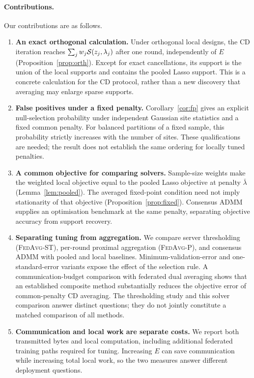\paragraph{Contributions.} Our contributions are as follows.

\begin{enumerate}
\item \textbf{An exact orthogonal calculation.} Under orthogonal local
designs, the CD iteration reaches
$\sum_jw_j\mathcal{S}(z_j,\lambda_j)$ after one round, independently of $E$
(Proposition~\ref{prop:orth}). Except for exact cancellations, its support
is the union of the local supports and contains the pooled Lasso support.
This is a concrete calculation for the CD protocol, rather than a new
discovery that averaging may enlarge sparse supports.

\item \textbf{False positives under a fixed penalty.}
Corollary~\ref{cor:fp} gives an explicit null-selection probability under
independent Gaussian site statistics and a fixed common penalty. For
balanced partitions of a fixed sample, this probability strictly increases
with the number of sites. These qualifications are needed; the result
does not establish the same ordering for locally tuned penalties.

\item \textbf{A common objective for comparing solvers.} Sample-size
weights make the weighted local objective equal to the pooled Lasso
objective at penalty $\bar\lambda$ (Lemma~\ref{lem:pooled}). The averaged
fixed-point condition need not imply stationarity of that objective
(Proposition~\ref{prop:fixed}). Consensus ADMM \citep{boyd2011} supplies
an optimisation benchmark at the same penalty, separating objective
accuracy from support recovery.

\item \textbf{Separating tuning from aggregation.} We compare
server thresholding (\textsc{FedAvg-ST}), per-round proximal
aggregation (\textsc{FedAvg-P}), and consensus ADMM with pooled and local
baselines. Minimum-validation-error and one-standard-error variants
expose the effect of the selection rule. A communication-budget comparison
with federated dual averaging shows that an established composite method
substantially reduces the objective error of common-penalty CD averaging.
The thresholding study and this solver comparison answer distinct questions;
they do not jointly constitute a matched comparison of all methods.

\item \textbf{Communication and local work are separate costs.} We report
both transmitted bytes and local computation, including additional
federated training paths required for tuning. Increasing $E$ can save communication while
increasing total local work, so the two measures answer different
deployment questions.
\end{enumerate}

